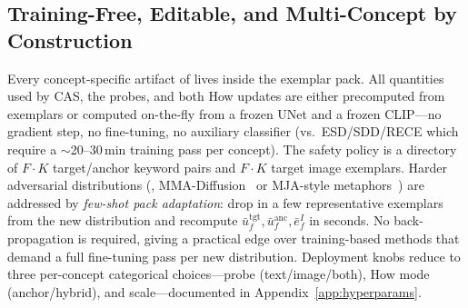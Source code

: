 \subsection{Training-Free, Editable, and Multi-Concept by Construction}
\label{subsec:training_free}

Every concept-specific artifact of \ours{} lives inside the exemplar pack. All quantities used by CAS, the probes, and both How updates are either precomputed from exemplars or computed on-the-fly from a frozen UNet and a frozen CLIP---no gradient step, no fine-tuning, no auxiliary classifier (vs.\ ESD/SDD/RECE which require a $\sim$20--30\,min training pass per concept). The safety policy is a directory of $F{\cdot}K$ target/anchor keyword pairs and $F{\cdot}K$ target image exemplars. Harder adversarial distributions (\eg, MMA-Diffusion~\citep{yang2024mma} or MJA-style metaphors~\citep{zhang2026reason2attack}) are addressed by \emph{few-shot pack adaptation}: drop in a few representative exemplars from the new distribution and recompute $\bar{u}^{\text{tgt}}_f, \bar{u}^{\text{anc}}_f, \bar{e}^{I}_f$ in seconds. No back-propagation is required, giving a practical edge over training-based methods that demand a full fine-tuning pass per new distribution. Deployment knobs reduce to three per-concept categorical choices---probe (text/image/both), How mode (anchor/hybrid), and scale---documented in Appendix~\ref{app:hyperparams}.

